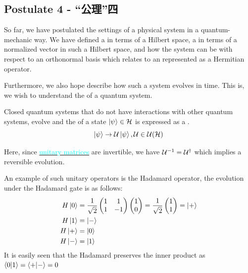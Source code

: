 \subsection{Postulate 4 - “公理”四}
So far, we have postulated the settings of a physical system in a quantum-mechanic way. We have defined a  in terms of a Hilbert space, a  in terms of a normalized vector in such a Hilbert space, and how the system can be  with respect to an orthonormal basis which relates to an  represented as a Hermitian operator. \par
Furthermore, we also hope describe how such a system evolves in time. This is, we wish to understand the  of a quantum system.
\begin{postulate}
    Closed quantum systems that do not have interactions with other quantum systems, evolve  and the  of a state $\ket{\psi} \in \mathcal{H}$ is expressed as a .
    $$\ket{\psi} \to \mathcal{U} \ket{\psi}, \mathcal{U} \in \mathcal{U}(\mathcal{H})$$
\end{postulate}
Here, since \hyperref[subsec:unitary]{\textcolor{cyan}{unitary matrices}} are invertible, we have $\mathcal{U}^{-1} = \mathcal{U}^{\dagger}$ which implies a reversible evolution. \par
An example of such unitary operators is the Hadamard operator, the evolution under the Hadamard gate is as follows:
\begin{align*}
    H \ket{0} &= \frac{1}{\sqrt{2}} \begin{pmatrix}
        1 & 1 \\
        1 & -1
    \end{pmatrix} \begin{pmatrix}
        1 \\ 0
    \end{pmatrix} = \frac{1}{\sqrt{2}} \begin{pmatrix}
        1 \\ 1
    \end{pmatrix} = \ket{+} \\
    H \ket{1} &= \ket{-} \\
    H \ket{+} &= \ket{0} \\
    H \ket{-} &= \ket{1}
\end{align*}
It is easily seen that the Hadamard preserves the inner product as $\braket{0}{1} = \braket{+}{-} = 0$

